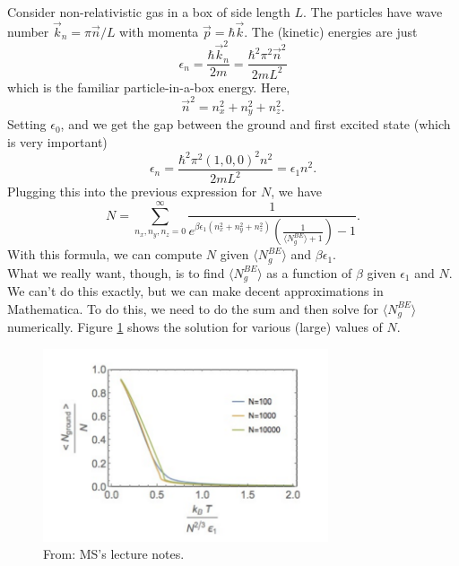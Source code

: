 \documentclass{book}
\theoremstyle{definition}
\newcommand{\f}[2]{\frac{#1}{#2}}
\newcommand{\lp}{\left(}
\newcommand{\rp}{\right)}
\begin{document}
Consider non-relativistic gas in a box of side length $L$. The particles have wave number $\vec{k}_n = \pi \vec{n}/L$ with momenta $\vec{p} = \hbar \vec{k}$. The (kinetic) energies are just 
\begin{equation*}
\epsilon_n = \f{\hbar \vec{k}_n^2}{2m} = \f{\hbar^2 \pi^2 \vec{n}^2}{2mL^2}
\end{equation*}
which is the familiar particle-in-a-box energy. Here, 
\begin{equation*}
\vec{n}^2 = n_x^2 + n_y^2 + n_z^2.
\end{equation*}
Setting $\epsilon_0$, and we get the gap between the ground and first excited state (which is very important)
\begin{equation*}
\epsilon_n  = \f{\hbar^2 \pi^2 (1,0,0)^2 n^2}{2mL^2}  = \epsilon_1 n^2. 
\end{equation*} 
Plugging this into the previous expression for $N$, we have
\begin{equation*}
N = \sum^\infty_{n_x,n_y,n_z=0} \f{1}{e^{\beta \epsilon_1(n_x^2+n_y^2+n_z^2)} \lp \f{1}{\langle N_g^{BE}\rangle +1} \rp -1 }.
\end{equation*}
With this formula, we can compute $N$ given $\langle N_g^{BE}\rangle$ and $\beta \epsilon_1$. \\


What we really want, though, is to find $\langle N_g^{BE}\rangle $ as a function of $\beta$ given $\epsilon_1$ and $N$. We can't do this exactly, but we can make decent approximations in Mathematica. To do this, we need to do the sum and then solve for $\langle N_g^{BE}\rangle$ numerically. Figure \ref{fig:3} shows the solution for various (large) values of $N$. 


\begin{figure}[!htb]
	\centering
	\includegraphics[width=0.75\textwidth]{images/BEC_3}
	\caption{From: MS's lecture notes.}
	\label{fig:3}
\end{figure}
\end{document}
